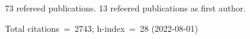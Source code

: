 73 refereed publications. 13 refeered publications as first author.

Total citations~=~2743; h-index~=~28 (2022-08-01)